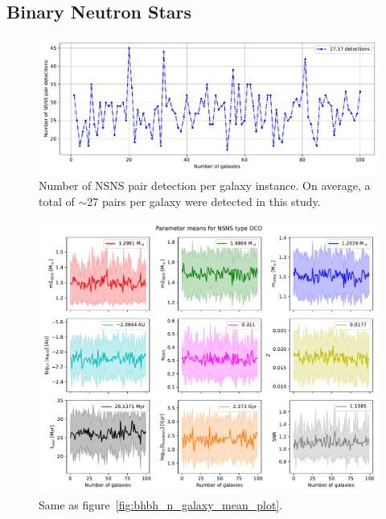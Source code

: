 \subsection{Binary Neutron Stars}
\begin{figure}[!h]
	\centering
    \includegraphics[width=\columnwidth]{analysis_data/004__images_for_latex/NSNS_n_detections}
	\caption{Number of NSNS pair detection per galaxy instance. On average, a total of $\sim$27 pairs per galaxy were detected in this study.}
	\label{fig:nsnsndetections}
\end{figure}

\begin{figure}[h]
	\centering
    \includegraphics[width=\columnwidth]{analysis_data/004__images_for_latex/NSNS_n_galaxy_mean_plot}
	\caption{Same as figure~\ref{fig:bhbh_n_galaxy_mean_plot}.}
	\label{fig:nsns_n_galaxy_mean_plot}
\end{figure}

